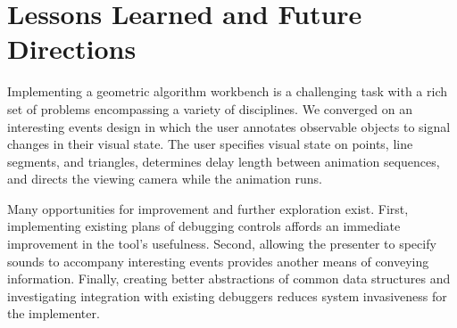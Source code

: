 \FloatBarrier
\section{Lessons Learned and Future Directions} 

Implementing a geometric algorithm workbench is a challenging task with a rich
set of problems encompassing a variety of disciplines. We converged on an
interesting events design in which the user annotates observable objects to
signal changes in their visual state. The user specifies visual state on points,
line segments, and triangles, determines delay length between animation
sequences, and directs the viewing camera while the animation runs.
	
Many opportunities for improvement and further exploration exist. First,
implementing existing plans of debugging controls affords an immediate
improvement in the tool's usefulness. Second, allowing the presenter to specify
sounds to accompany interesting events provides another means of conveying
information. Finally, creating better abstractions of common data structures and
investigating integration with existing debuggers reduces system invasiveness
for the implementer.